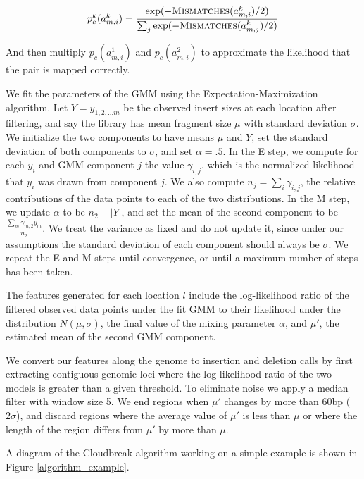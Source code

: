 \documentclass[11pt]{article}
\begin{document}
\begin{description}
\[ p^{k}_c(a^{k}_{m,i}) = \frac{\exp({-\textsc{Mismatches}(a^{k}_{m,i})/2)}}{\sum_j{\exp(-\textsc{Mismatches}(a^{k}_{m,j})/2)}} \]

And then multiply $p_c(a^{1}_{m,i})$ and $p_c(a^{2}_{m,i})$ to approximate the likelihood that the pair is mapped correctly.

We fit the parameters of the GMM using the Expectation-Maximization algorithm. Let $Y = y_{1,2, \ldots m}$ be the observed insert sizes at each location after filtering, and say the library has mean fragment size $\mu$ with standard deviation $\sigma$. We initialize the two components to have means $\mu$ and $\bar{Y}$, set the standard deviation of both components to $\sigma$, and set $\alpha = .5$. In the E step, we compute for each $y_i$ and GMM component $j$ the value $\gamma_{i,j}$, which is the normalized likelihood that $y_i$ was drawn from component $j$. We also compute $n_j = \sum_i{\gamma_{i,j}}$, the relative contributions of the data points to each of the two distributions. In the M step, we update $\alpha$ to be $n_2 - \left|Y\right|$, and set the mean of the second component to be $\frac{\sum_m{\gamma_{m,2}y_m}}{n_2}$. We treat the variance as fixed and do not update it, since under our assumptions the standard deviation of each component should always be $\sigma$. We repeat the E and M steps until convergence, or until a maximum number of steps has been taken.

The features generated for each location $l$ include the log-likelihood ratio of the filtered observed data points under the fit GMM to their likelihood under the distribution $N(\mu,\sigma)$, the final value of the mixing parameter $\alpha$, and $\mu'$, the estimated mean of the second GMM component.

\item[\sc{PostProcess}] We convert our features along the genome to insertion and deletion calls by first extracting contiguous genomic loci where the log-likelihood ratio of the two models is greater than a given threshold. To eliminate noise we apply a median filter with window size 5. We end regions when $\mu'$ changes by more than 60bp ($2\sigma$), and discard regions where the average value of $\mu'$ is less than $\mu$ or where the length of the region differs from $\mu'$ by more than $\mu$.
\end{description}

A diagram of the Cloudbreak algorithm working on a simple example is shown in Figure \ref{algorithm_example}.
\end{document}

